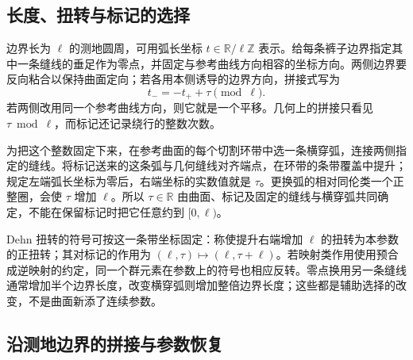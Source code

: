 \subsection{长度、扭转与标记的选择}
\label{g4:subsec:0604:06}

边界长为 \(\ell\) 的测地圆周，可用弧长坐标 \(t\in\mathbb R/\ell\mathbb Z\) 表示。给每条裤子边界指定其中一条缝线的垂足作为零点，并固定与参考曲线方向相容的坐标方向。两侧边界要反向粘合以保持曲面定向；若各用本侧诱导的边界方向，拼接式写为
\[
	t_-=-t_++\tau\pmod\ell.
\]
若两侧改用同一个参考曲线方向，则它就是一个平移。几何上的拼接只看见 \(\tau\bmod\ell\)，而标记还记录绕行的整数次数。

\ProseParagraphBreak

为把这个整数固定下来，在参考曲面的每个切割环带中选一条横穿弧，连接两侧指定的缝线。将标记送来的这条弧与几何缝线对齐端点，在环带的条带覆盖中提升；规定左端弧长坐标为零后，右端坐标的实数值就是 \(\tau\)。更换弧的相对同伦类一个正整圈，会使 \(\tau\) 增加 \(\ell\)。所以 \(\tau\in\mathbb R\) 由曲面、标记及固定的缝线与横穿弧共同确定，不能在保留标记时把它任意约到 \([0,\ell)\)。

\ProseParagraphBreak

Dehn 扭转的符号可按这一条带坐标固定：称使提升右端增加 \(\ell\) 的扭转为本参数的正扭转；其对标记的作用为 \((\ell,\tau)\mapsto(\ell,\tau+\ell)\)。若映射类作用使用预合成逆映射的约定，同一个群元素在参数上的符号也相应反转。零点换用另一条缝线通常增加半个边界长度，改变横穿弧则增加整倍边界长度；这些都是辅助选择的改变，不是曲面新添了连续参数。

\subsection{沿测地边界的拼接与参数恢复}
\label{g4:subsec:0604:07}

